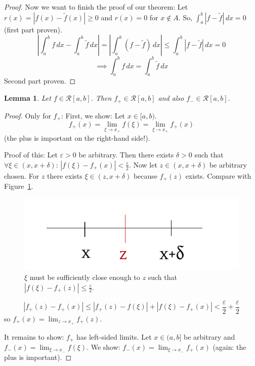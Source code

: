 \documentclass{article}
\newtheorem{lemma}{Lemma}  \numberwithin{lemma}{section}
\newcommand{\card}[1]{\left|#1\right|}
\begin{document}
\begin{proof}
  Now we want to finish the proof of our theorem: Let $r(x) = \card{f(x) - \tilde f(x)} \geq 0$ and $r(x) = 0$ for $x \not\in A$.
  So, $\int_a^b \card{f - \tilde f} \, dx = 0$ (first part proven).
  \[ \card{\int_a^b f \, dx - \int_a^b \tilde f \, dx} = \card{\int_a^b (f - \tilde f) \, dx} \leq \int_a^b \card{f - \tilde f} \, dx = 0 \]
  \[ \implies \int_a^b f\, dx = \int_a^b \tilde f \, dx \]
  Second part proven.
\end{proof}

\begin{lemma} %
  Let $f \in \mathcal R[a,b]$. Then $f_+ \in \mathcal R[a,b]$ and also $f_- \in \mathcal R[a,b]$.
\end{lemma}
\begin{proof}
  Only for $f_+$: First, we show: Let $x \in [a,b)$.
  \[ f_+(x) = \lim_{\xi \to x_+} f(\xi) = \lim_{\xi \to x_+} f_+(x) \]
  (the plus is important on the right-hand side!).

  Proof of this: Let $\varepsilon > 0$ be arbitrary. Then there exists $\delta > 0$ such that
  $\forall \xi \in (x, x + \delta)$: $\card{f(\xi) - f_+(x)} < \frac\varepsilon2$.
  Now let $z \in (x, x + \delta)$ be arbitrary chosen. For $z$ there exists $\xi \in (z, x + \delta)$ because $f_+(z)$ exists.
  Compare with Figure~\ref{img:xz}.

  \begin{figure}[t]
    \begin{center}
      \includegraphics{img/20_x_z.pdf}
      \caption{$\xi$ must be sufficiently close enough to $z$ such that $\card{f(\xi) - f_+(z)} \leq \frac\varepsilon2$.}
      \label{img:xz}
    \end{center}
  \end{figure}

  \[ \card{f_+(z) - f_+(x)} \leq \card{f_+(z) - f(\xi)} + \card{f(\xi) - f_+(x)} < \frac\varepsilon2 + \frac\varepsilon2 \]
  so $f_+(x) = \lim_{z \to x_+} f_+(z)$.

  It remains to show: $f_+$ has left-sided limits.
  Let $x \in (a,b]$ be arbitrary and $f_-(x) = \lim_{\xi \to x_-} f(\xi)$. We show: $f_-(x) = \lim_{\xi \to x_-} f_+(x)$ (again: the plus is important).


\end{proof}
\end{document}
